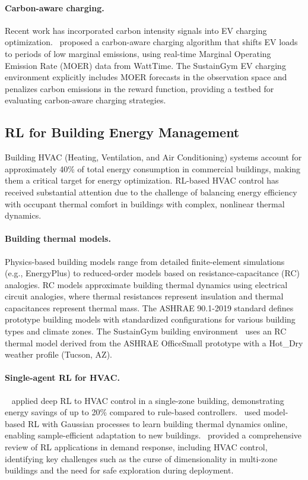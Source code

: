 \paragraph{Carbon-aware charging.} Recent work has incorporated carbon intensity signals into EV charging optimization.~\citet{xu2023carbon_ev} proposed a carbon-aware charging algorithm that shifts EV loads to periods of low marginal emissions, using real-time Marginal Operating Emission Rate (MOER) data from WattTime. The SustainGym EV charging environment explicitly includes MOER forecasts in the observation space and penalizes carbon emissions in the reward function, providing a testbed for evaluating carbon-aware charging strategies.

\subsection{RL for Building Energy Management}

Building HVAC (Heating, Ventilation, and Air Conditioning) systems account for approximately 40\% of total energy consumption in commercial buildings, making them a critical target for energy optimization. RL-based HVAC control has received substantial attention due to the challenge of balancing energy efficiency with occupant thermal comfort in buildings with complex, nonlinear thermal dynamics.

\paragraph{Building thermal models.} Physics-based building models range from detailed finite-element simulations (e.g., EnergyPlus) to reduced-order models based on resistance-capacitance (RC) analogies. RC models approximate building thermal dynamics using electrical circuit analogies, where thermal resistances represent insulation and thermal capacitances represent thermal mass. The ASHRAE 90.1-2019 standard defines prototype building models with standardized configurations for various building types and climate zones. The SustainGym building environment~\citep{yeh2023sustaingym} uses an RC thermal model derived from the ASHRAE OfficeSmall prototype with a Hot\_Dry weather profile (Tucson, AZ).

\paragraph{Single-agent RL for HVAC.}~\citet{wei2017deep_hvac} applied deep RL to HVAC control in a single-zone building, demonstrating energy savings of up to 20\% compared to rule-based controllers.~\citet{zhang2019model_hvac} used model-based RL with Gaussian processes to learn building thermal dynamics online, enabling sample-efficient adaptation to new buildings.~\citet{vazquezcanteli2019review} provided a comprehensive review of RL applications in demand response, including HVAC control, identifying key challenges such as the curse of dimensionality in multi-zone buildings and the need for safe exploration during deployment.

